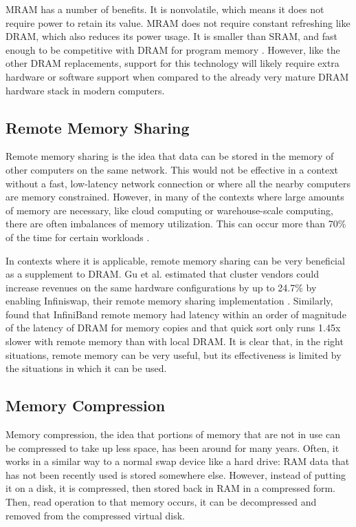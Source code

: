 \documentclass[doublespace,nopageskip]{VTthesis}
\begin{document}
MRAM has a number of benefits. It is nonvolatile, which means it does not require power to retain its value. MRAM does not require constant refreshing like DRAM, which also reduces its power usage. It is smaller than SRAM, and fast enough to be competitive with DRAM for program memory \cite{mram99, mramprospects}. However, like the other DRAM replacements, support for this technology will likely require extra hardware or software support when compared to the already very mature DRAM hardware stack in modern computers.

\subsection{Remote Memory Sharing}\label{ss:remote_memory_sharing}
Remote memory sharing is the idea that data can be stored in the memory of other computers on the same network. This would not be effective in a context without a fast, low-latency network connection or where all the nearby computers are memory constrained. However, in many of the contexts where large amounts of memory are necessary, like cloud computing or warehouse-scale computing, there are often imbalances of memory utilization. This can occur more than 70\% of the time for certain workloads \cite{infiniswap}.

In contexts where it is applicable, remote memory sharing can be very beneficial as a supplement to DRAM. Gu et al. estimated that cluster vendors could increase revenues on the same hardware configurations by up to 24.7\% by enabling Infiniswap, their remote memory sharing implementation \cite{infiniswap}. Similarly, \cite{swapinfiniband} found that InfiniBand remote memory had latency within an order of magnitude of the latency of DRAM for memory copies and that quick sort only runs 1.45x slower with remote memory than with local DRAM. It is clear that, in the right situations, remote memory can be very useful, but its effectiveness is limited by the situations in which it can be used.

\subsection{Memory Compression}\label{ss:memory_compression}
Memory compression, the idea that portions of memory that are not in use can be compressed to take up less space, has been around for many years. Often, it works in a similar way to a normal swap device like a hard drive: RAM data that has not been recently used is stored somewhere else. However, instead of putting it on a disk, it is compressed, then stored back in RAM in a compressed form. Then, read operation to that memory occurs, it can be decompressed and removed from the compressed virtual disk.
\end{document}
